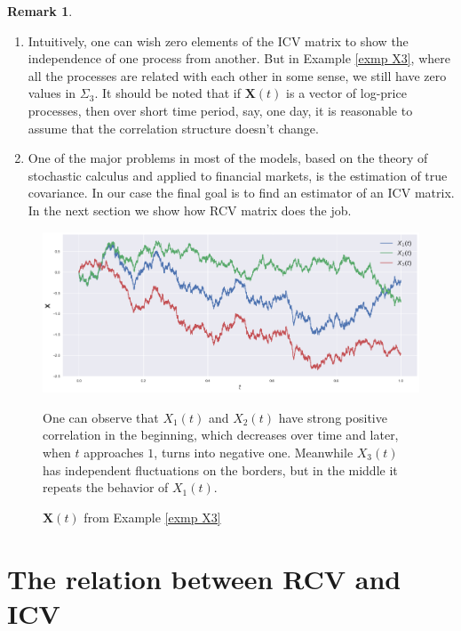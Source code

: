 \documentclass[a4paper,11pt]{book}
\theoremstyle{plain}
\theoremstyle{definition}
\newtheorem{rmrk}[thm]{Remark}
\begin{document}
	\begin{rmrk} \
		\begin{enumerate}
			\item 
			Intuitively, one can wish zero elements of the ICV matrix to show the independence of one process from another. But in Example \ref{exmp X3}, where all the processes are related with each other in some sense, we still have zero values in $\Sigma_3$. It should be noted that if $\mathbf{X}(t)$ is a vector of log-price processes, then over short time period, say, one day, it is reasonable to assume that the correlation structure doesn't change.
			\item One of the major problems in most of the models, based on the theory of stochastic calculus and applied to financial markets, is the estimation of true covariance. In our case the final goal is to find an estimator of an ICV matrix. In the next section we show how RCV matrix does the job.
		\end{enumerate}
	\end{rmrk}
	
	\begin{figure}
		\begin{center} \centering
			\includegraphics[scale=0.4]{X3}
			\caption{$\mathbf{X}(t)$ from Example \ref{exmp X3}}
			\smallskip
			\small
			One can observe that $X_1(t)$ and $X_2(t)$ have strong positive correlation in the beginning, which decreases over time and later, when $t$ approaches $1$, turns into negative one. Meanwhile $X_3(t)$ has independent fluctuations on the borders, but in the middle it repeats the behavior of $X_1(t)$.
		\end{center}
	\end{figure}
	
	\section{The relation between RCV and ICV}
	
\end{document}
